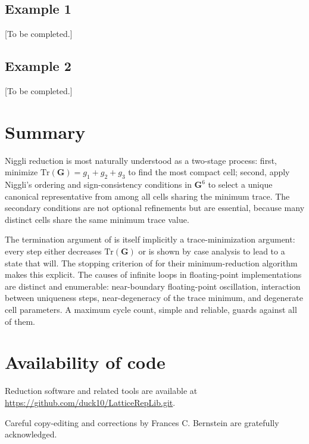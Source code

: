 \documentclass[preprint]{iucr}              %
\numberwithin{equation}{section}
\newcommand{\GVI}{\ensuremath{\mathbf{G}^{6}}}
\begin{document}
	\subsection{Example 1}
	
	[To be completed.]
	
	\subsection{Example 2}
	
	[To be completed.]
	
	
	\section{Summary}
	\label{sec:summary}
	
	Niggli reduction is most naturally understood as a two-stage process:
	first, minimize $\mathrm{Tr}(\mathbf{G}) = g_1 + g_2 + g_3$ to find
	the most compact cell; second, apply Niggli's ordering and
	sign-consistency conditions in \GVI{} to select a unique canonical
	representative from among all cells sharing the minimum trace. The
	secondary conditions are not optional refinements but are essential,
	because many distinct cells share the same minimum trace value.
	
	The termination argument of  is itself
	implicitly a trace-minimization argument: every step either decreases
	$\mathrm{Tr}(\mathbf{G})$ or is shown by case analysis to lead to a
	state that will. The stopping criterion of
	 for their minimum-reduction
	algorithm makes this explicit. The causes of infinite loops in
	floating-point implementations are distinct and enumerable:
	near-boundary floating-point oscillation, interaction between
	uniqueness steps, near-degeneracy of the trace minimum, and
	degenerate cell parameters. A maximum cycle count, simple and
	reliable, guards against all of them.
	
	
	\section{Availability of code}
	
	Reduction software and related tools are available at
	\url{https://github.com/duck10/LatticeRepLib.git}.
	
	
	
	Careful copy-editing and corrections by Frances C. Bernstein are
	gratefully acknowledged.
	
\end{document}
